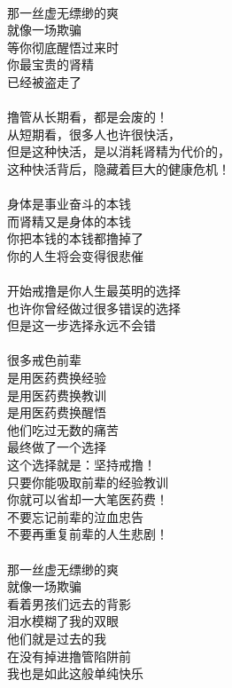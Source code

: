 \begin{poem}[中国戒撸往事]
    \begin{multicols}{2}
        \centering~\\
        那一丝虚无缥缈的爽 \\ 就像一场欺骗 \\ 等你彻底醒悟过来时 \\ 你最宝贵的肾精 \\ 已经被盗走了 \\~\\
        撸管从长期看，都是会废的！ \\ 从短期看，很多人也许很快活， \\ 但是这种快活，是以消耗肾精为代价的， \\ 这种快活背后，隐藏着巨大的健康危机！ \\~\\
        身体是事业奋斗的本钱 \\ 而肾精又是身体的本钱 \\ 你把本钱的本钱都撸掉了 \\ 你的人生将会变得很悲催 \\~\\
        开始戒撸是你人生最英明的选择 \\ 也许你曾经做过很多错误的选择 \\ 但是这一步选择永远不会错 \\~\\
        很多戒色前辈 \\ 是用医药费换经验 \\ 是用医药费换教训 \\ 是用医药费换醒悟 \\ 他们吃过无数的痛苦 \\ 最终做了一个选择 \\ 这个选择就是：坚持戒撸！ \\ 只要你能吸取前辈的经验教训 \\ 你就可以省却一大笔医药费！ \\ 不要忘记前辈的泣血忠告 \\ 不要再重复前辈的人生悲剧！ \\~\\
        那一丝虚无缥缈的爽 \\ 就像一场欺骗 \\ 看着男孩们远去的背影 \\ 泪水模糊了我的双眼 \\ 他们就是过去的我 \\ 在没有掉进撸管陷阱前 \\ 我也是如此这般单纯快乐 \\~\\

\end{multicols}
\end{poem}
